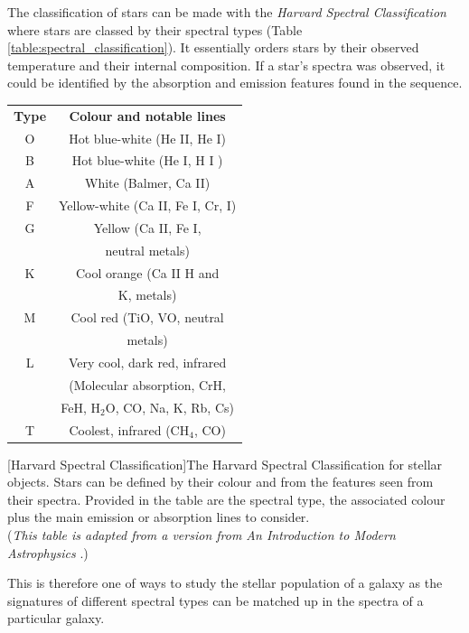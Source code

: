 \documentclass[12pt, twocolumn]{revtex4}    %
\begin{document}
The classification of stars can be made with the \textit{Harvard Spectral Classification} where stars are classed by their spectral types (Table \ref{table:spectral_classification}). It essentially orders stars by their observed temperature and their internal composition. If a star's spectra was observed, it could be identified by the absorption and emission features found in the sequence.    
\begin{center}
\begin{tabular}{c@{\hskip 20pt}c} 
 \hline
 \textbf{Type} & \textbf{Colour and notable lines} \\ [0.5ex] 
 O & Hot blue-white (He II, He I) \\
 B & Hot blue-white (He I, H I ) \\
 A & White (Balmer, Ca II) \\
 F & Yellow-white (Ca II, Fe I, Cr, I) \\
 G & Yellow (Ca II, Fe I,  \\
  & neutral metals) \\
 K & Cool orange (Ca II H and \\ 
  & K, metals) \\
 M & Cool red (TiO, VO, neutral \\
  & metals) \\
 L & Very cool, dark red, infrared \\
  & (Molecular absorption, CrH, \\
  & FeH, H$_2$O, CO, Na, K, Rb, Cs) \\
 T & Coolest, infrared (CH$_4$, CO) \\
 \hline
\end{tabular}
[Harvard Spectral Classification]{The Harvard Spectral Classification for stellar objects. Stars can be defined by their colour and from the features seen from their spectra. Provided in the table are the spectral type, the associated colour plus the main emission or absorption lines to consider. \\
(\textit{This table is adapted from a version from An Introduction to Modern Astrophysics} \citep{carroll_astro}.)}
\label{table:spectral_classification}
\end{center}


This is therefore one of ways to study the stellar population of a galaxy as the signatures of different spectral types can be matched up in the spectra of a particular galaxy. 
\end{document}
